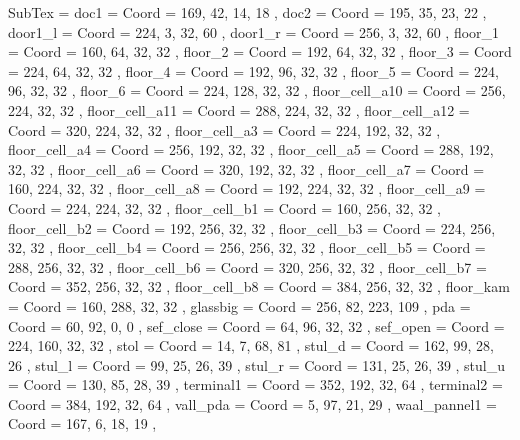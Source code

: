 SubTex = {
	doc1								= { Coord = { 169, 42, 14, 18 } },
	doc2								= { Coord = { 195, 35, 23, 22 } },
	door1_l								= { Coord = { 224, 3, 32, 60 } },
	door1_r								= { Coord = { 256, 3, 32, 60 } },
	floor_1								= { Coord = { 160, 64, 32, 32 } },
	floor_2								= { Coord = { 192, 64, 32, 32 } },
	floor_3								= { Coord = { 224, 64, 32, 32 } },
	floor_4								= { Coord = { 192, 96, 32, 32 } },
	floor_5								= { Coord = { 224, 96, 32, 32 } },
	floor_6								= { Coord = { 224, 128, 32, 32 } },
	floor_cell_a10								= { Coord = { 256, 224, 32, 32 } },
	floor_cell_a11								= { Coord = { 288, 224, 32, 32 } },
	floor_cell_a12								= { Coord = { 320, 224, 32, 32 } },
	floor_cell_a3								= { Coord = { 224, 192, 32, 32 } },
	floor_cell_a4								= { Coord = { 256, 192, 32, 32 } },
	floor_cell_a5								= { Coord = { 288, 192, 32, 32 } },
	floor_cell_a6								= { Coord = { 320, 192, 32, 32 } },
	floor_cell_a7								= { Coord = { 160, 224, 32, 32 } },
	floor_cell_a8								= { Coord = { 192, 224, 32, 32 } },
	floor_cell_a9								= { Coord = { 224, 224, 32, 32 } },
	floor_cell_b1								= { Coord = { 160, 256, 32, 32 } },
	floor_cell_b2								= { Coord = { 192, 256, 32, 32 } },
	floor_cell_b3								= { Coord = { 224, 256, 32, 32 } },
	floor_cell_b4								= { Coord = { 256, 256, 32, 32 } },
	floor_cell_b5								= { Coord = { 288, 256, 32, 32 } },
	floor_cell_b6								= { Coord = { 320, 256, 32, 32 } },
	floor_cell_b7								= { Coord = { 352, 256, 32, 32 } },
	floor_cell_b8								= { Coord = { 384, 256, 32, 32 } },
	floor_kam								= { Coord = { 160, 288, 32, 32 } },
	glassbig								= { Coord = { 256, 82, 223, 109 } },
	pda								= { Coord = { 60, 92, 0, 0 } },
	sef_close								= { Coord = { 64, 96, 32, 32 } },
	sef_open								= { Coord = { 224, 160, 32, 32 } },
	stol								= { Coord = { 14, 7, 68, 81 } },
	stul_d								= { Coord = { 162, 99, 28, 26 } },
	stul_l								= { Coord = { 99, 25, 26, 39 } },
	stul_r								= { Coord = { 131, 25, 26, 39 } },
	stul_u								= { Coord = { 130, 85, 28, 39 } },
	terminal1								= { Coord = { 352, 192, 32, 64 } },
	terminal2								= { Coord = { 384, 192, 32, 64 } },
	vall_pda								= { Coord = { 5, 97, 21, 29 } },
	waal_pannel1								= { Coord = { 167, 6, 18, 19 } },
}
